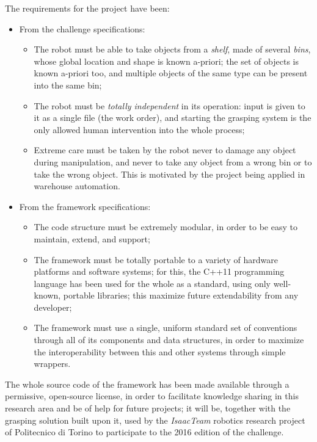 \documentclass[a4paper,11pt]{article}
\begin{document}
The requirements for the project have been:
\begin{itemize}
\item{From  the challenge specifications:
    \begin{itemize}
    \item{The robot must be able to take objects from a \emph{shelf},
      made of several \emph{bins}, whose global location and shape is known
      a-priori; the set of objects is known a-priori too, and multiple objects
      of the same type can be present into the same bin;}
    \item{The robot must be \emph{totally independent} in its
      operation: input is given to it as a single file (the work
      order),
      and starting the grasping system is the only allowed
      human intervention into the whole process;}
    \item{Extreme care must be taken by the robot never to damage any
      object during manipulation, and never to take any object from a
      wrong bin or to take the wrong object. This is motivated by the
      project being applied in warehouse automation.}
    \end{itemize}
    }
\item{From the framework specifications:
  \begin{itemize}
  \item{The code structure must be extremely modular, in order to be
    easy to maintain, extend, and support;}
  \item{The framework must be totally portable to a variety of hardware
    platforms and software systems; for this, the C++11 programming language has been used for the
  whole as a standard, using only well-known, portable libraries; this
  maximize future extendability from any developer;}
  \item{The framework must use a single, uniform standard set of conventions through all
      of its components and data structures, in order to maximize the
    interoperability between this and other systems through simple wrappers.}
  \end{itemize}
  }
\end{itemize}

The whole source code of the framework has been made available through a
permissive, open-source license, in order to facilitate knowledge sharing in
this research area and be of help for future projects; it will be, together with
the grasping solution built upon it, used by the \emph{IsaacTeam} robotics research
project of Politecnico di Torino to participate to the 2016 edition of the
challenge.
\end{document}
